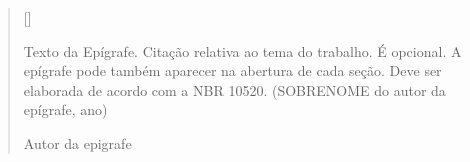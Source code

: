 \begin{epigrafe}
\vspace*{\fill}
\begin{verse}[\versewidth]
	
Texto da Epígrafe. Citação relativa ao tema do trabalho. É opcional. A epígrafe pode também aparecer na abertura de cada seção. Deve ser elaborada de acordo com a NBR 10520. (SOBRENOME do autor da epígrafe, ano)
		
\begin{flushright}		
	Autor da epigrafe
\end{flushright}

\end{verse}
\end{epigrafe}